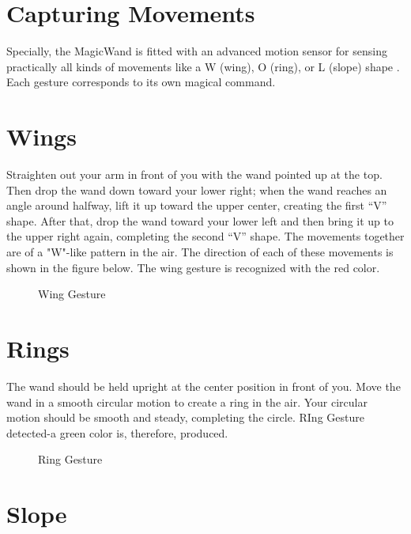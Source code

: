 \section{Capturing Movements}
Specially, the MagicWand is fitted with an advanced motion sensor for sensing practically all kinds of movements like a W (wing), O (ring), or L (slope) shape \cite{manualsArduCamB0330}. Each gesture corresponds to its own magical command.


\section{Wings}
Straighten out your arm in front of you with the wand pointed up at the top. Then drop the wand down toward your lower right; when the wand reaches an angle around halfway, lift it up toward the upper center, creating the first “V” shape. After that, drop the wand toward your lower left and then bring it up to the upper right again, completing the second “V” shape. The movements together are of a "W"-like pattern in the air. The direction of each of these movements is shown in the figure below. The wing gesture is recognized with the red color.
\begin{figure}[H]
	\centering
	\caption{Wing Gesture}
\end{figure}

\section{Rings}

The wand should be held upright at the center position in front of you. Move the wand in a smooth circular motion to create a ring in the air. Your circular motion should be smooth and steady, completing the circle. RIng Gesture detected-a green color is, therefore, produced.

\begin{figure}[h!]
\centering
{}
\caption{Ring Gesture}
\end{figure}


\section{Slope}

